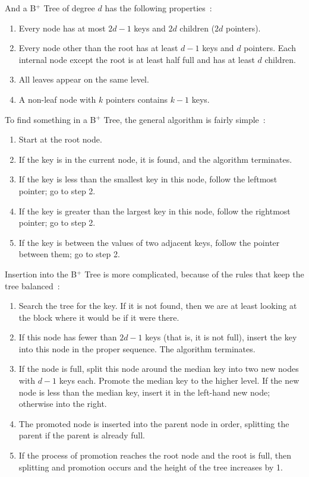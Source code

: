 \documentclass[a4paper]{report}
\begin{document}
And a B$^{+}$ Tree of degree $d$ has the following properties~\cite{osi}:

\begin{enumerate}
	\item Every node has at most $2d-1$ keys and $2d$ children ($2d$ pointers).
	\item Every node other than the root has at least $d-1$ keys and $d$ pointers. Each internal node except the root is at least half full and has at least $d$ children.
	\item All leaves appear on the same level.
	\item A non-leaf node with $k$ pointers contains $k-1$ keys.
\end{enumerate}

To find something in a B$^{+}$ Tree, the general algorithm is fairly simple~\cite{osi}:

\begin{enumerate}
	\item Start at the root node. 
	\item If the key is in the current node, it is found, and the algorithm terminates.
	\item If the key is less than the smallest key in this node, follow the leftmost pointer; go to step 2.
	\item If the key is greater than the largest key in this node, follow the rightmost pointer; go to step 2.
	\item If the key is between the values of two adjacent keys, follow the pointer between them; go to step 2.
\end{enumerate}


Insertion into the B$^{+}$ Tree is more complicated, because of the rules that keep the tree balanced~\cite{osi}:

\begin{enumerate}
	\item Search the tree for the key. If it is not found, then we are at least looking at the block where it would be if it were there.
	\item If this node has fewer than $2d-1$ keys (that is, it is not full), insert the key into this node in the proper sequence. The algorithm terminates.
	\item If the node is full, split this node around the median key into two new nodes with $d-1$ keys each. Promote the median key to the higher level. If the new node is less than the median key, insert it in the left-hand new node; otherwise into the right.
	\item The promoted node is inserted into the parent node in order, splitting the parent if the parent is already full.
	\item If the process of promotion reaches the root node and the root is full, then splitting and promotion occurs and the height of the tree increases by 1.
\end{enumerate}
\end{document}
